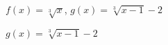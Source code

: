 {$f(x) = \sqrt[3]{x}$, $g(x) = \sqrt[3]{x-1}-2$ }
{$g(x) = \sqrt[3]{x-1}-2$ \\ 
\begin{center}
\end{center}}